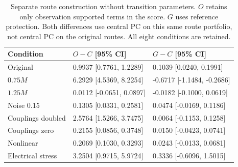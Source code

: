 \begin{table}[t]
\centering
\caption{Separate route construction without transition parameters. $O$ retains only observation supported terms in the score. $G$ uses reference protection. Both differences use central PC on this same route portfolio, not central PC on the original routes. All eight conditions are retained.}
\label{tab:guarded-ablation}
\footnotesize\setlength{\tabcolsep}{3pt}\renewcommand{\arraystretch}{1.12}
\begin{tabular}{@{}p{}p{}p{}@{}}
\toprule
Condition & $O-C$ [95\% CI] & $G-C$ [95\% CI] \\
\midrule
Original & 0.9937 [0.7761, 1.2289] & 0.1039 [0.0240, 0.1991] \\
$0.75M$ & 6.2929 [4.5369, 8.2254] & -0.6717 [-1.1484, -0.2686] \\
$1.25M$ & 0.0112 [-0.0651, 0.0897] & -0.0182 [-0.1000, 0.0619] \\
Noise 0.15 & 0.1305 [0.0331, 0.2581] & 0.0474 [-0.0169, 0.1186] \\
Couplings doubled & 2.5764 [1.5266, 3.7475] & 0.0064 [-0.1153, 0.1258] \\
Couplings zero & 0.2155 [0.0856, 0.3748] & 0.0150 [-0.0423, 0.0741] \\
Nonlinear & 0.2069 [0.1030, 0.3293] & 0.0243 [-0.0133, 0.0681] \\
Electrical stress & 3.2504 [0.9715, 5.9724] & 0.3336 [-0.6096, 1.5015] \\
\bottomrule
\end{tabular}
\end{table}
